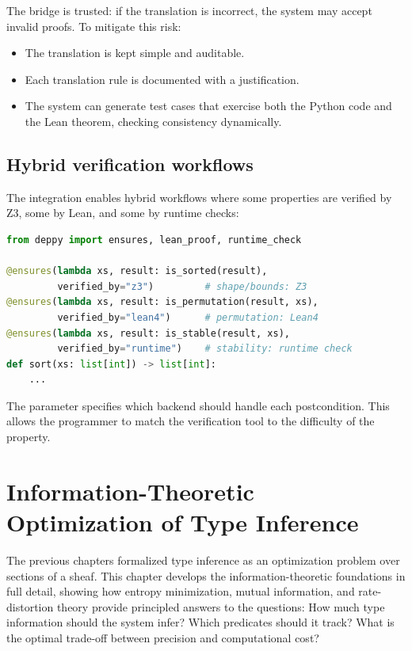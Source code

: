 \documentclass[11pt]{report}
\DeclareRobustCommand{\py}[1]{\texttt{\detokenize{#1}}}
\theoremstyle{definition}
\theoremstyle{plain}
\begin{document}
The bridge is trusted: if the translation is incorrect, the system may accept
invalid proofs. To mitigate this risk:
\begin{itemize}[nosep]
  \item The translation is kept simple and auditable.
  \item Each translation rule is documented with a justification.
  \item The system can generate test cases that exercise both the Python code
        and the Lean theorem, checking consistency dynamically.
\end{itemize}

\section{Hybrid verification workflows}

The integration enables hybrid workflows where some properties are verified
by Z3, some by Lean, and some by runtime checks:

\begin{lstlisting}[style=deppy,language=Python]
from deppy import ensures, lean_proof, runtime_check

@ensures(lambda xs, result: is_sorted(result),
         verified_by="z3")         # shape/bounds: Z3
@ensures(lambda xs, result: is_permutation(result, xs),
         verified_by="lean4")      # permutation: Lean4
@ensures(lambda xs, result: is_stable(result, xs),
         verified_by="runtime")    # stability: runtime check
def sort(xs: list[int]) -> list[int]:
    ...
\end{lstlisting}

The \py{verified_by} parameter specifies which backend should handle each
postcondition. This allows the programmer to match the verification tool to
the difficulty of the property.

\chapter{Information-Theoretic Optimization of Type Inference}

The previous chapters formalized type inference as an optimization problem
over sections of a sheaf. This chapter develops the information-theoretic
foundations in full detail, showing how entropy minimization, mutual
information, and rate-distortion theory provide principled answers to the
questions: How much type information should the system infer? Which
predicates should it track? What is the optimal trade-off between precision
and computational cost?
\end{document}
